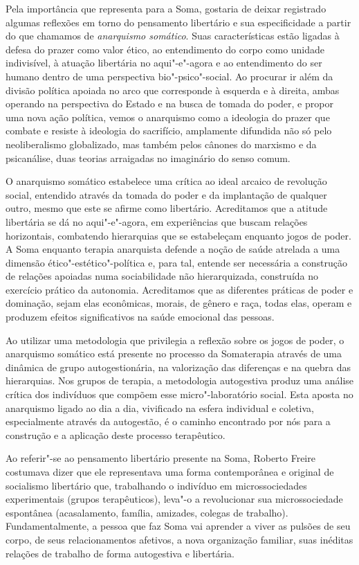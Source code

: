 Pela importância que representa para a Soma, gostaria de deixar
registrado algumas reflexões em torno do pensamento libertário e sua
especificidade a partir do que chamamos de \emph{anarquismo somático}. Suas
características estão ligadas à defesa do prazer como valor ético, ao
entendimento do corpo como unidade indivisível, à atuação libertária no
aqui"-e"-agora e ao entendimento do ser humano dentro de uma perspectiva
bio"-psico"-social. Ao procurar ir além da divisão política apoiada no
arco que corresponde à esquerda e à direita, ambas operando na
perspectiva do Estado e na busca de tomada do poder, e propor uma nova
ação política, vemos o anarquismo como a ideologia do prazer que combate
e resiste à ideologia do sacrifício, amplamente difundida não só pelo
neoliberalismo globalizado, mas também pelos cânones do marxismo e da
psicanálise, duas teorias arraigadas no imaginário do senso comum.

O anarquismo somático estabelece uma crítica ao ideal arcaico de
revolução social, entendido através da tomada do poder e da implantação
de qualquer outro, mesmo que este se afirme como libertário. Acreditamos
que a atitude libertária se dá no aqui"-e"-agora, em experiências que
buscam relações horizontais, combatendo hierarquias que se estabeleçam
enquanto jogos de poder. A Soma enquanto terapia anarquista defende a
noção de saúde atrelada a uma dimensão ético"-estético"-política e, para
tal, entende ser necessária a construção de relações apoiadas numa
sociabilidade não hierarquizada, construída no exercício prático da
autonomia. Acreditamos que as diferentes práticas de poder e dominação,
sejam elas econômicas, morais, de gênero e raça, todas elas, operam e
produzem efeitos significativos na saúde emocional das pessoas.

Ao utilizar uma metodologia que privilegia a reflexão sobre os jogos de
poder, o anarquismo somático está presente no processo da Somaterapia
através de uma dinâmica de grupo autogestionária, na valorização das
diferenças e na quebra das hierarquias. Nos grupos de terapia, a
metodologia autogestiva produz uma análise crítica dos indivíduos que
compõem esse micro"-laboratório social. Esta aposta no anarquismo ligado
ao dia a dia, vivificado na esfera individual e coletiva, especialmente
através da autogestão, é o caminho encontrado por nós para a construção
e a aplicação deste processo terapêutico.

Ao referir"-se ao pensamento libertário presente na Soma, Roberto Freire
costumava dizer que ele representava uma forma contemporânea e original
de socialismo libertário que, trabalhando o indivíduo em
microssociedades experimentais (grupos terapêuticos), leva"-o a
revolucionar sua microssociedade espontânea (acasalamento, família,
amizades, colegas de trabalho). Fundamentalmente, a pessoa que faz Soma
vai aprender a viver as pulsões de seu corpo, de seus relacionamentos
afetivos, a nova organização familiar, suas inéditas relações de
trabalho de forma autogestiva e libertária.

